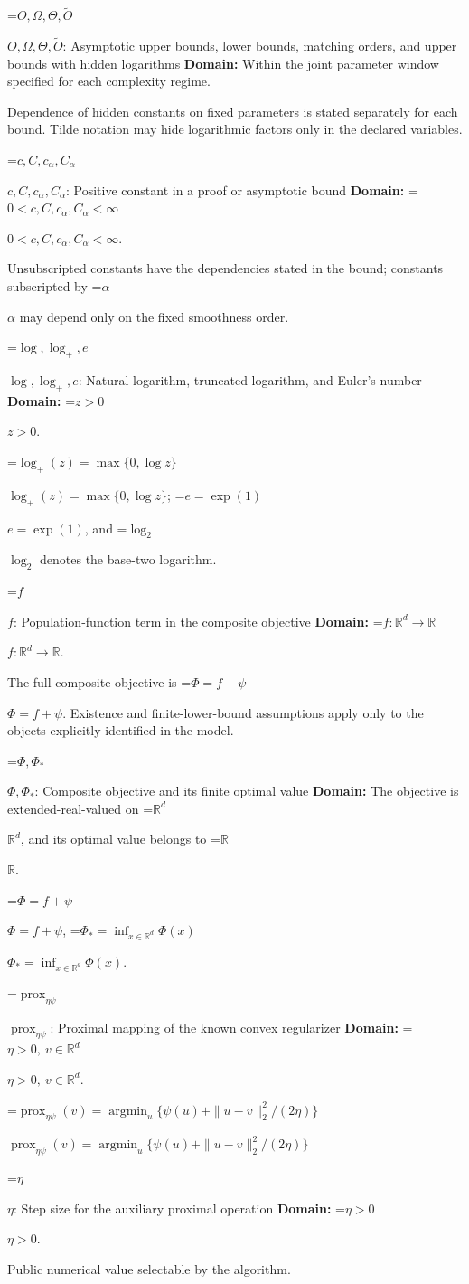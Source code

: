 \documentclass[10pt,a4paper]{article}
\newcommand{\AtlasMath}[1]{\par\begingroup\centering\setbox0=\hbox{$\displaystyle #1$}\ifdim\wd0>1.4\linewidth\typeout{ATLAS WIDE FORMULA: \the\wd0}\fi\ifdim\wd0>\linewidth\resizebox{\linewidth}{!}{\box0}\else\box0\fi\par\endgroup}
\newcommand{\AtlasInlineMath}[1]{\begingroup\setbox0=\hbox{$#1$}\ifdim\wd0>.4\linewidth\endgroup\AtlasMath{#1}\else\endgroup$#1$\fi}
\begin{document}
\AtlasInlineMath{O,\Omega,\Theta,\widetilde{O}}: Asymptotic upper bounds, lower bounds, matching orders, and upper bounds with hidden logarithms \textbf{Domain:} Within the joint parameter window specified for each complexity regime.

Dependence of hidden constants on fixed parameters is stated separately for each bound. Tilde notation may hide logarithmic factors only in the declared variables.

\AtlasInlineMath{c,C,c_\alpha,C_\alpha}: Positive constant in a proof or asymptotic bound \textbf{Domain:} \AtlasInlineMath{0<c,C,c_\alpha,C_\alpha<\infty}.

Unsubscripted constants have the dependencies stated in the bound; constants subscripted by \AtlasInlineMath{\alpha} may depend only on the fixed smoothness order.

\AtlasInlineMath{\log,\log_+,e}: Natural logarithm, truncated logarithm, and Euler's number \textbf{Domain:} \AtlasInlineMath{z>0}.

\AtlasInlineMath{\log_+(z)=\max\{0,\log z\}}; \AtlasInlineMath{e=\exp(1)}, and \AtlasInlineMath{\log_2} denotes the base-two logarithm.

\AtlasInlineMath{f}: Population-function term in the composite objective \textbf{Domain:} \AtlasInlineMath{f:\mathbb{R}^d\to\mathbb{R}}.

The full composite objective is \AtlasInlineMath{\Phi=f+\psi}. Existence and finite-lower-bound assumptions apply only to the objects explicitly identified in the model.

\AtlasInlineMath{\Phi,\Phi_*}: Composite objective and its finite optimal value \textbf{Domain:} The objective is extended-real-valued on \AtlasInlineMath{\mathbb{R}^d}, and its optimal value belongs to \AtlasInlineMath{\mathbb{R}}.

\AtlasInlineMath{\Phi=f+\psi}, \AtlasInlineMath{\Phi_*=\inf_{x\in\mathbb{R}^d}\Phi(x)}.

\AtlasInlineMath{\operatorname{prox}_{\eta\psi}}: Proximal mapping of the known convex regularizer \textbf{Domain:} \AtlasInlineMath{\eta>0,\ v\in\mathbb{R}^d}.

\AtlasInlineMath{\operatorname{prox}_{\eta\psi}(v)=\operatorname{argmin}_u\{\psi(u)+\|u-v\|_2^2/(2\eta)\}}

\AtlasInlineMath{\eta}: Step size for the auxiliary proximal operation \textbf{Domain:} \AtlasInlineMath{\eta>0}.

Public numerical value selectable by the algorithm.
\end{document}
